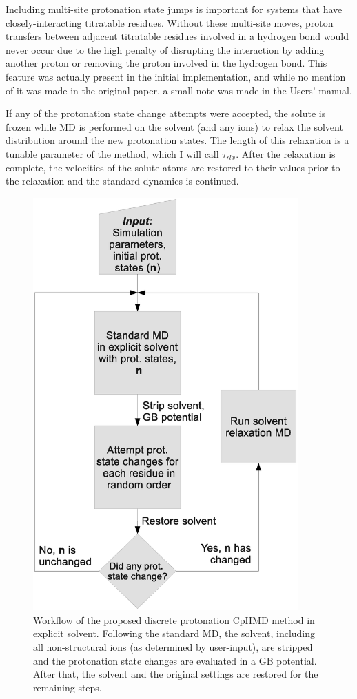 Including multi-site protonation state jumps is important for systems that have
closely-interacting titratable residues. Without these multi-site moves,
proton transfers between adjacent titratable residues involved in a hydrogen
bond would never occur due to the high penalty of disrupting the interaction by
adding another proton or removing the proton involved in the hydrogen bond. This
feature was actually present in the initial implementation, and while no mention
of it was made in the original paper, a small note was made in the Users'
manual.  \cite{Mongan_JComputChem_2004_v25_p2038}

If any of the protonation state change attempts were accepted, the solute is
frozen while MD is performed on the solvent (and any ions) to relax the solvent
distribution around the new protonation states.  The length of this relaxation
is a tunable parameter of the method, which I will call $\tau_{rlx}$. After the
relaxation is complete, the velocities of the solute atoms are restored to
their values prior to the relaxation and the standard dynamics is continued.

\begin{figure}
   \includegraphics[width=4in]{CpHMD_Workflow.eps}
   \caption{Workflow of the proposed discrete protonation CpHMD method in
            explicit solvent. Following the standard MD, the solvent, including
            all non-structural ions (as determined by user-input), are stripped
            and the protonation state changes are evaluated in a GB potential.
            After that, the solvent and the original settings are restored for
            the remaining steps.}
   \label{fig4:workflow}
\end{figure}

